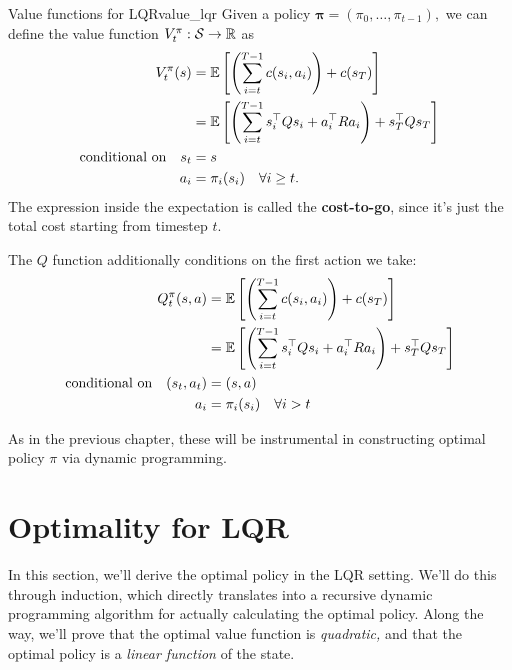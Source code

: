 \documentclass[../main/main]{subfiles}
\begin{document}
\begin{definition}{Value functions for LQR}{value_lqr}
    Given a policy $\mathbf{\pi} = (\pi_0, \dots, \pi_{t-1}),$ we can define the
    value function $V^\pi_t : \mathcal{S} \to \mathbb{R}$ as \[ \begin{split}
        V^\pi_t (s) &= \operatorname*{\mathbb{E}} \left[ \left( \sum_{i=t}^{T-1} c(s_i, a_i) \right) + c(s_T) \right] \\
        &= \operatorname*{\mathbb{E}} \left[ \left( \sum_{i=t}^{T-1} s_i^\top Q s_i + a_i^\top R a_i \right) + s_T^\top Q s_T \right] \\
        \textrm{conditional on} \quad s_t &= s \\
        a_i &= \pi_i(s_i) \quad \forall i \ge t.
    \end{split} \]
    The expression inside the expectation is called the \textbf{cost-to-go},
    since it's just the total cost starting from timestep $t$.

    The $Q$ function additionally conditions on the first
    action we take: \[ \begin{split}
        Q^\pi_t (s, a) &= \operatorname*{\mathbb{E}} \left[ \left( \sum_{i=t}^{T-1} c(s_i, a_i) \right) + c(s_T) \right] \\
        &= \operatorname*{\mathbb{E}} \left[ \left( \sum_{i=t}^{T-1} s_i^\top Q s_i + a_i^\top R a_i \right) + s_T^\top Q s_T \right] \\
        \textrm{conditional on} \quad (s_t, a_t) &= (s, a) \\
        \quad a_i &= \pi_i(s_i) \quad \forall i > t
    \end{split} \]
\end{definition}

As in the previous chapter, these will be instrumental in constructing optimal policy $\pi$ via dynamic
programming.

\section{Optimality for LQR} \label{sec:optimal_lqr}

In this section, we'll derive the optimal policy in the LQR setting.
We'll do this through induction, which directly translates into a recursive dynamic programming algorithm for actually calculating the optimal policy.
Along the way, we'll prove that the optimal value function is \emph{quadratic,}
and that the optimal policy is a \emph{linear function} of the state.
\end{document}
